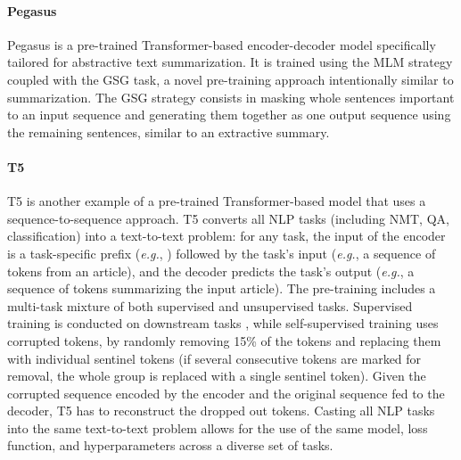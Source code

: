 \paragraph{Pegasus} 

Pegasus \citep{zhang2020pegasus} is a pre-trained Transformer-based encoder-decoder model specifically tailored for abstractive text summarization. It is trained using the \ac{MLM} strategy coupled with the \ac{GSG} task, a novel pre-training approach intentionally similar to summarization. The \ac{GSG} strategy consists in masking whole sentences important to an input sequence and generating them together as one output sequence using the remaining sentences, similar to an extractive summary. 


\paragraph{T5}

\ac{T5} \citep{raffel2020exploring} is another example of a pre-trained Transformer-based model that uses a sequence-to-sequence approach. \ac{T5} converts all \ac{NLP} tasks (including \ac{NMT}, \ac{QA}, classification) into a text-to-text problem: for any task, the input of the encoder is a task-specific prefix (\textit{e.g.}, ) followed by the task's input (\textit{e.g.}, a sequence of tokens from an article), and the decoder predicts the task's output (\textit{e.g.}, a sequence of tokens summarizing the input article). The pre-training includes a multi-task mixture of both supervised and unsupervised tasks. Supervised training is conducted on downstream tasks \citep{wang2018glue}, while self-supervised training uses corrupted tokens, by randomly removing 15\% of the tokens and replacing them with individual sentinel tokens (if several consecutive tokens are marked for removal, the whole group is replaced with a single sentinel token). Given the corrupted sequence encoded by the encoder and the original sequence fed to the decoder, \ac{T5} has to reconstruct the dropped out tokens. Casting all \ac{NLP} tasks into the same text-to-text problem allows for the use of the same model, loss function, and hyperparameters across a diverse set of tasks. 


